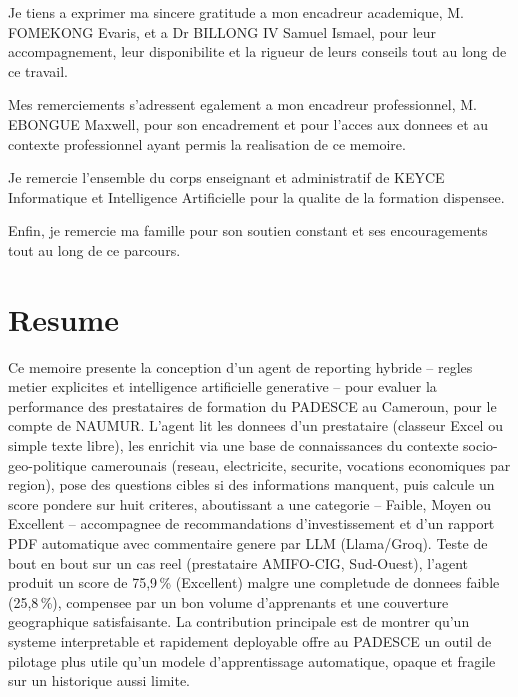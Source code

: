 \documentclass[12pt,a4paper,twoside,openany]{report}
\begin{document}
Je tiens a exprimer ma sincere gratitude a mon encadreur academique, M. FOMEKONG Evaris, et a Dr BILLONG IV Samuel Ismael, pour leur accompagnement, leur disponibilite et la rigueur de leurs conseils tout au long de ce travail.

Mes remerciements s'adressent egalement a mon encadreur professionnel, M. EBONGUE Maxwell, pour son encadrement et pour l'acces aux donnees et au contexte professionnel ayant permis la realisation de ce memoire.

Je remercie l'ensemble du corps enseignant et administratif de KEYCE Informatique et Intelligence Artificielle pour la qualite de la formation dispensee.

Enfin, je remercie ma famille pour son soutien constant et ses encouragements tout au long de ce parcours.

\newpage


\chapter*{Resume}

{\setlength{\parskip}{0pt}
Ce memoire presente la conception d'un agent de reporting hybride -- regles metier explicites et intelligence artificielle generative -- pour evaluer la performance des prestataires de formation du PADESCE au Cameroun, pour le compte de NAUMUR. L'agent lit les donnees d'un prestataire (classeur Excel ou simple texte libre), les enrichit via une base de connaissances du contexte socio-geo-politique camerounais (reseau, electricite, securite, vocations economiques par region), pose des questions cibles si des informations manquent, puis calcule un score pondere sur huit criteres, aboutissant a une categorie -- Faible, Moyen ou Excellent -- accompagnee de recommandations d'investissement et d'un rapport PDF automatique avec commentaire genere par LLM (Llama/Groq).
Teste de bout en bout sur un cas reel (prestataire AMIFO-CIG, Sud-Ouest), l'agent produit un score de 75,9\,\% (Excellent) malgre une completude de donnees faible (25,8\,\%), compensee par un bon volume d'apprenants et une couverture geographique satisfaisante. La contribution principale est de montrer qu'un systeme interpretable et rapidement deployable offre au PADESCE un outil de pilotage plus utile qu'un modele d'apprentissage automatique, opaque et fragile sur un historique aussi limite.
}
\end{document}
